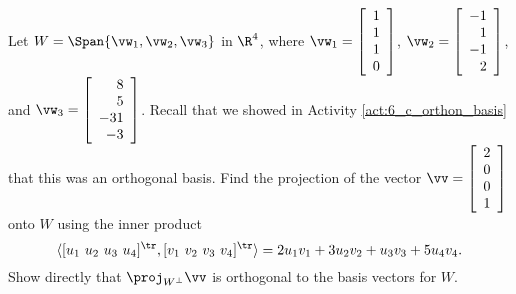 \begin{activity} \label{act:6_c_orth_projection} Let $W = \Span\{\vw_1, \vw_2,\vw_3\}$ in $\R^4$, where $\vw_1 = \left[ \begin{array}{c} 1 \\ 1 \\ 1 \\ 0 \end{array} \right]$, $\vw_2 = \left[ \begin{array}{r} -1 \\ 1 \\ -1 \\ 2\end{array} \right]$, and $\vw_3 =  \left[ \begin{array}{r} 8 \\ 5 \\ -31 \\ -3 \end{array} \right]$. Recall that we showed in Activity \ref{act:6_c_orthon_basis} that this was an orthogonal basis. Find the projection of the vector $\vv = \left[ \begin{array}{c} 2 \\0 \\ 0 \\ 1 \end{array} \right]$ onto $W$ using the inner product 
\[\langle [u_1 \ u_2 \ u_3 \ u_4]^{\tr}, [v_1 \ v_2 \ v_3 \ v_4]^{\tr} \rangle = 2u_1v_1+3u_2v_2+u_3v_3+5u_4v_4.\]
Show directly that $\proj_{W^{\perp}} \vv$ is orthogonal to the basis vectors for $W$.

    


\end{activity}
